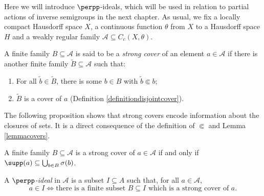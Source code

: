 Here we will introduce $\perpp$-ideals, which will be used in relation to partial actions of inverse semigroups in the next chapter. As usual, we fix a locally compact Hausdorff space $X$, a continuous function $\theta$ from $X$ to a Hausdorff space $H$ and a weakly regular family $\mathcal{A}\subseteq C_c(X,\theta)$.

\begin{definition}\label{definitionstrongcover}
A finite family $B\subseteq\mathcal{A}$ is said to be a \emph{strong cover} of an element $a\in\mathcal{A}$ if there is another finite family $\widetilde{B}\subseteq\mathcal{A}$ such that:
\begin{enumerate}
\item[(i)] For all $\widetilde{b}\in\widetilde{B}$, there is some $b\in B$ with $\widetilde{b}\Subset b$;
\item[(ii)] $\widetilde{B}$ is a cover of $a$ (Definition \ref{definitiondisjointcover}).
\end{enumerate}
\end{definition}

The following proposition shows that strong covers encode information about the closures of sets. It is a direct consequence of the definition of $\Subset$ and Lemma \ref{lemmacovers}.

\begin{proposition}\label{propositiongoodformofstrongcover}
A finite family $B\subseteq\mathcal{A}$ is a strong cover of $a\in\mathcal{A}$ if and only if $\supp(a)\subseteq\bigcup_{b\in B}\sigma(b)$.
\end{proposition}

\begin{definition}\label{definitionperppideal}
A \emph{$\perpp$-ideal} in $\mathcal{A}$ is a subset $I\subseteq A$ such that, for all $a\in\mathcal{A}$,
\[a\in I\iff \text{there is a finite subset }B\subseteq I\text{ which is a strong cover of }a.\]
\end{definition}


